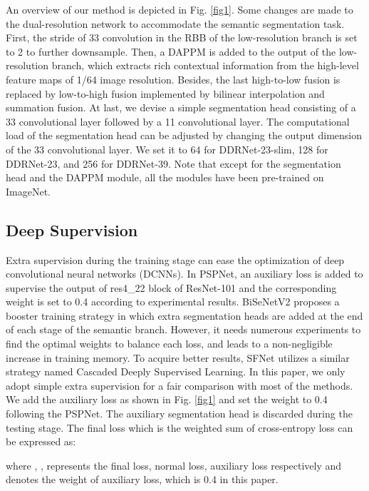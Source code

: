 \documentclass[journal]{IEEEtran}
\begin{document}
An overview of our method is depicted in Fig. \ref{fig1}. Some changes are made to the dual-resolution network to accommodate the semantic segmentation task. First, the stride of 33 convolution in the RBB of the low-resolution branch is set to 2 to further downsample. Then, a DAPPM is added to the output of the low-resolution branch, which extracts rich contextual information from the high-level feature maps of 1/64 image resolution. Besides, the last high-to-low fusion is replaced by low-to-high fusion implemented by bilinear interpolation and summation fusion. At last, we devise a simple segmentation head consisting of a 33 convolutional layer followed by a 11 convolutional layer. The computational load of the segmentation head can be adjusted by changing the output dimension of the 33 convolutional layer. We set it to 64 for DDRNet-23-slim, 128 for DDRNet-23, and 256 for DDRNet-39. Note that except for the segmentation head and the DAPPM module, all the modules have been pre-trained on ImageNet.


\subsection{Deep Supervision}

Extra supervision during the training stage can ease the optimization of deep convolutional neural networks (DCNNs). In PSPNet, an auxiliary loss is added to supervise the output of res4\_22 block of ResNet-101 and the corresponding weight is set to 0.4 according to experimental results\cite{zhao2017pyramid}. BiSeNetV2\cite{yu2020bisenet} proposes a booster training strategy in which extra segmentation heads are added at the end of each stage of the semantic branch. However, it needs numerous experiments to find the optimal weights to balance each loss, and leads to a non-negligible increase in training memory. To acquire better results, SFNet\cite{li2020semantic} utilizes a similar strategy named Cascaded Deeply Supervised Learning. In this paper, we only adopt simple extra supervision for a fair comparison with most of the methods. We add the auxiliary loss as shown in Fig. \ref{fig1} and set the weight to 0.4 following the PSPNet. The auxiliary segmentation head is discarded during the testing stage. The final loss which is the weighted sum of cross-entropy loss can be expressed as:

where , ,  represents the final loss, normal loss, auxiliary loss respectively and  denotes the weight of auxiliary loss, which is 0.4 in this paper.
\end{document}
